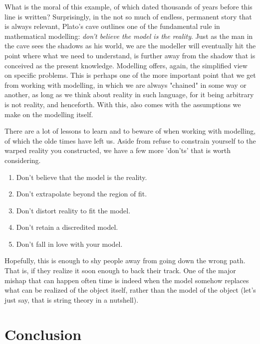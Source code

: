 What is the moral of this example, of which dated thousands of years before this line is written? Surprisingly, in the not so much of endless, permanent story that is always relevant, Plato's cave outlines one of the fundamental rule in mathematical modelling: \textit{don't believe the model is the reality}. Just as the man in the cave sees the shadows as his world, we are the modeller will eventually hit the point where what we need to understand, is further away from the shadow that is conceived as the present knowledge. Modelling offers, again, the simplified view on specific problems. This is perhaps one of the more important point that we get from working with modelling, in which we are always "chained" in some way or another, as long as we think about reality in such language, for it being arbitrary is not reality, and henceforth. With this, also comes with the assumptions we make on the modelling itself. 

There are a lot of lessons to learn and to beware of when working with modelling, of which the olde times have left us. Aside from refuse to constrain yourself to the warped reality you constructed, we have a few more 'don'ts' that is worth considering. 
\begin{axiom}\hfill\break
    \begin{enumerate}[topsep=0pt,itemsep=1pt]
        \item Don't believe that the model is the reality. 
        \item Don't extrapolate beyond the region of fit. 
        \item Don't distort reality to fit the model. 
        \item Don't retain a discredited model. 
        \item Don't fall in love with your model. 
    \end{enumerate}
\end{axiom}
Hopefully, this is enough to shy people away from going down the wrong path. That is, if they realize it soon enough to back their track. One of the major mishap that can happen often time is indeed when the model somehow replaces what can be realized of the object itself, rather than the model of the object (let's just say, that is string theory in a nutshell). 

\section{Conclusion}



